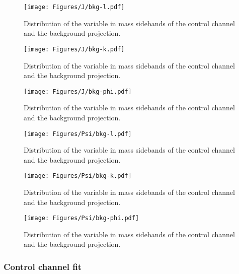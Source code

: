 \begin{figure}[!hbt]
  \centering
  \texttt{[image: Figures/J/bkg-l.pdf]}
  \caption{Distribution of the \cTL variable in mass sidebands of the \BtoKstJpsi control channel and the background \pdf projection.}
  \label{fig:back-l-bin4}
\end{figure}

\begin{figure}[!hbt]
  \centering
  \texttt{[image: Figures/J/bkg-k.pdf]}
  \caption{Distribution of the \cTK variable in mass sidebands of the \BtoKstJpsi control channel and the background \pdf projection.}
  \label{fig:back-k-bin4}
\end{figure}

\begin{figure}[!hbt]
  \centering
  \texttt{[image: Figures/J/bkg-phi.pdf]}
  \caption{Distribution of the \PHI variable in mass sidebands of the \BtoKstJpsi control channel and the background \pdf projection.}
  \label{fig:back-phi-bin4}
\end{figure}

\begin{figure}[!hbt]
  \centering
  \texttt{[image: Figures/Psi/bkg-l.pdf]}
  \caption{Distribution of the \cTL variable in mass sidebands of the \BtoKstpsip control channel and the background \pdf projection.}
  \label{fig:back-l-bin6}
\end{figure}

\begin{figure}[!hbt]
  \centering
  \texttt{[image: Figures/Psi/bkg-k.pdf]}
  \caption{Distribution of the \cTK variable in mass sidebands of the \BtoKstpsip control channel and the background \pdf projection.}
  \label{fig:back-k-bin6}
\end{figure}

\begin{figure}[!hbt]
  \centering
  \texttt{[image: Figures/Psi/bkg-phi.pdf]}
  \caption{Distribution of the \PHI variable in mass sidebands of the \BtoKstpsip control channel and the background \pdf projection.}
  \label{fig:back-phi-bin6}
\end{figure}
\clearpage

\subsubsection{Control channel fit}
\label{sec:fitcc}

